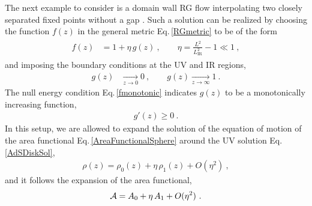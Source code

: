 The next example to consider is a domain wall RG flow interpolating two closely separated fixed points without a gap \cite{Liu:2012eea}.
Such a solution can be realized by choosing the function $f(z)$ in the general metric Eq.\,\eqref{RGmetric} to be of the form
\begin{align}
\begin{aligned}
f(z) &= 1 + \eta\, g(z) \ , \qquad \eta = \frac{L^2}{L_\text{IR}^2} - 1 \ll 1 \ , 
\end{aligned}
\end{align}
and imposing the boundary conditions at the UV and IR regions,
\begin{align}
	 g(z) &\xrightarrow[z\to 0]{}0 \ ,\qquad g(z) \xrightarrow[z\to \infty]{}1 \ .
\end{align}
The null energy condition Eq.\,\eqref{fmonotonic} indicates $g(z)$ to be a monotonically increasing function,
\begin{align}\label{Mon_g}
	g'(z)\ge 0 \ .
\end{align}
In this setup, we are allowed to expand the solution of the equation of motion of the area functional Eq.\,\eqref{AreaFunctionalSphere} around the UV solution Eq.\,\eqref{AdSDiskSol},
\begin{align}
\rho(z) = \rho_0(z) + \eta\, \rho_1(z) + O(\eta^2) \ ,
\end{align}
and it follows the expansion of the area functional,
\begin{align}
{\cal A} = A_0 + \eta \,A_1 + O(\eta^2) \ .
\end{align}

